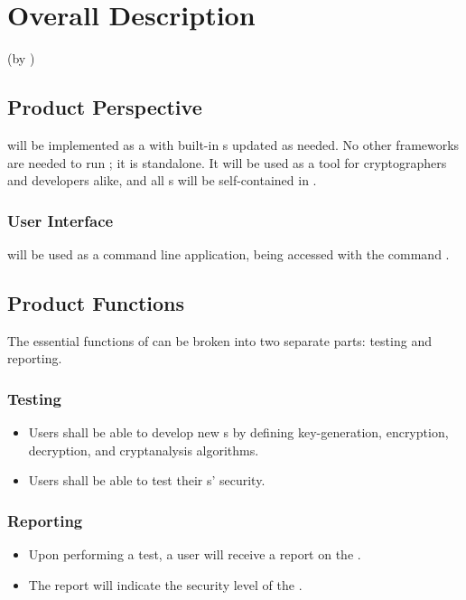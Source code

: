 \section{Overall Description}
(by \dd)


\subsection{Product Perspective}

\cry{} will be implemented as a \cf{} with built-in \cs s
updated as needed. No other frameworks are needed to run
\cry; it is standalone. It will be used as a
tool for cryptographers and developers alike, and all \cs s
will be self-contained in \cry.

\subsubsection{User Interface}
\cry{} will be used as a command line application, being
accessed with the command .


\subsection{Product Functions}

The essential functions of \cry{} can be broken into two
separate parts: testing and reporting.

\subsubsection{Testing}
\begin{itemize}
\item Users shall be able to develop new \cs s{}
  by defining key-generation, encryption, decryption,
  and cryptanalysis algorithms.
\item Users shall be able to test their \cs s' security.
\end{itemize}

\subsubsection{Reporting}
\begin{itemize}
\item Upon performing a test, a user will receive a report on
  the \cs.
\item The report will indicate the security level of the \cs.
\end{itemize}

